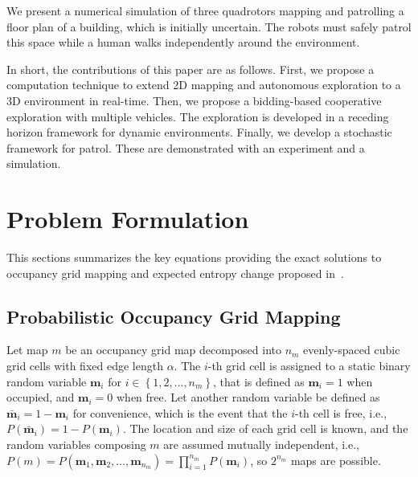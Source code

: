 \documentclass[smallextended]{svjour3}       %
\newcommand{\braces}[1]{\ensuremath{\left\{ #1 \right\}}}
\begin{document}
We present a numerical simulation of three quadrotors mapping and patrolling a floor plan of a building, which is initially uncertain. The robots must safely patrol this space while a human walks independently around the environment.

In short, the contributions of this paper are as follows. First, we propose a computation technique to extend 2D mapping and autonomous exploration to a 3D environment in real-time. Then, we propose a bidding-based cooperative exploration with multiple vehicles. The exploration is developed in a receding horizon framework for dynamic environments. Finally, we develop a stochastic framework for patrol. These are demonstrated with an experiment and a simulation.





\section{Problem Formulation}
\label{sec:ProbDef}

This sections summarizes the key equations providing the exact solutions to occupancy grid mapping and expected entropy change proposed in~\cite{KauLeeAiMos16,KauTakAiLee17,KauTakAiLee18,KauAiLee16}.

\subsection{Probabilistic Occupancy Grid Mapping}
\label{subsec:POGM}
Let map $m$ be an occupancy grid map decomposed into $n_m$ evenly-spaced cubic grid cells with fixed edge length $\alpha$. The $i$-th grid cell is assigned to a static binary random variable $\mathbf{m}_i$ for $i\in\braces{1,2,\ldots,n_m}$, that is defined as $\mathbf{m}_i=1$ when occupied, and $\mathbf{m}_i=0$ when free. Let another random variable be defined as $\bar{\mathbf{m}}_i=1-\mathbf{m}_i$ for convenience, which is the event that the $i$-th cell is free, i.e., $P(\bar{\mathbf{m}}_i)=1-P(\mathbf{m}_i)$. The location and size of each grid cell is known, and the random variables composing $m$ are assumed mutually independent, i.e., $P(m)=P(\mathbf{m}_1,\mathbf{m}_2,\ldots,\mathbf{m}_{n_m})=\prod_{i=1}^{n_m}P(\mathbf{m}_i)$, so $2^{n_m}$ maps are possible.
\end{document}
